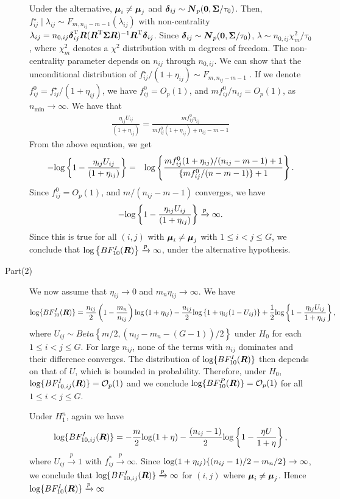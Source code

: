 \documentclass[12pt]{article}
\def\log{\hbox{log}}
\def\log{\hbox{log}}
\def\bse{\begin{eqnarray*}}
\def\ese{\end{eqnarray*}}
\def\be{\begin{eqnarray}}
\def\ee{\end{eqnarray}}
\def\trans{^{\rm T}}
\newcommand{\uN}       {\mbox{\boldmath$N$}}
\newcommand{\uR}       {\mbox{\boldmath$R$}}
\newcommand{\udelta}            {\mbox{\boldmath$\delta$}}
\newcommand{\umu}               {\mbox{\boldmath$\mu$}}
\newcommand{\uSigma}            {\mbox{\boldmath$\Sigma$}}
\begin{document}
\begin{description}
Under the alternative, $\umu_{i} \neq \umu_{j}$ and $\udelta_{ij} \sim \uN_{p}({\bf 0}, \uSigma /\tau_{0})$.
Then, $f_{ij}^{\star} \mid   \lambda_{ij} \sim F_{m, n_{ij}-m-1}(\lambda_{ij})$
with non-centrality $\lambda_{ij} = n_{0,ij}\udelta_{ij}\trans\uR(\uR\trans \uSigma \uR)^{-1}\uR\trans \udelta_{ij}$.
Since $\udelta_{ij} \sim \uN_{p}({\bf 0}, \uSigma /\tau_{0})$, $\lambda \sim n_{0,ij}\chi_{m}^{2}/\tau_{0}$,
where $\chi_{m}^{2}$ denotes a $\chi^{2}$ distribution with m degrees of freedom. The non-centrality parameter depends on $n_{ij}$ through $n_{0,ij}$.
We can show that the unconditional distribution of $f_{ij}^{\star} /(1 + \eta_{ij}) \sim F_{m, n_{ij}-m-1}$ \citep[see][page 704]{johnson2005bayes}.
If we denote $f_{ij}^{0} =  f_{ij}^{\star} /(1 + \eta_{ij})$, we have $f_{ij}^{0} = O_{p}(1)$, and $mf_{ij}^{0}/n_{ij} = O_{p}(1)$, as $n_{\min} \rightarrow \infty$.
We have that
\be
\frac{\eta_{ij} U_{ij}}{(1+\eta_{ij})} = \frac{ m f_{ij}^{0}\eta_{ij}}{m f_{ij}^{0}(1+\eta_{ij})+n_{ij}-m-1} \nonumber
\ee
From the above equation, we get
\be
-\log\left\{ 1 - \frac{\eta_{ij} U_{ij}}{(1+\eta_{ij})} \right \} &=& \log\left\{ \frac{mf_{ij}^{0}(1+\eta_{ij})/(n_{ij}-m-1) + 1}{\{mf_{ij}^{0}/(n-m-1)\} +1 }\right\}. \nonumber
\ee
Since $f_{ij}^{0} = O_{p}(1)$, and $m/(n_{ij}-m-1)$ converges, we have
\bse
 -\log\left\{ 1 - \frac{\eta_{ij} U_{ij}}{(1+\eta_{ij})} \right \} \xrightarrow[]{p} \infty.
\ese
Since this is true for all $(i,j)$ with $\umu_i \neq \umu_j$ with $1 \leq i < j \leq G$,  we conclude that $\log\left\{BF^{I}_{10}(\uR) \right \} \xrightarrow[]{p} \infty$, under the alternative hypothesis.

\item[Part(2)]
We now assume that $\eta_{ij} \rightarrow 0$ and $m_n \eta_{ij} \rightarrow \infty$. We have
\be
 \log\{BF^{I}_{10}(\uR)\} =\frac{n_{ij}}{2}\left( 1 - \frac{m_n}{n_{ij}}\right)\log\left(1 + \eta_{ij} \right) - \frac{n_{ij}}{2}\log\left\{ 1 + \eta_{ij}(1-U_{ij}) \right \} +\frac{1}{2}\log \left\{1 - \frac{\eta_{ij} U_{ij}}{1+\eta_{ij}}\right\},  \nonumber
\ee
where $U_{ij} \sim Beta\left\{ m/2,  (n_{ij} - m_n -(G-1))/2 \right\}$ under $H_0$ for each $1 \leq i < j \leq G$.
For large $n_{ij}$, none of the terms with $n_{ij}$ dominates and their difference converges.
The distribution of $\log\{BF^{I}_{10}(\uR) \}$ then depends on that of $U$, which is bounded in probability.
Therefore, under $H_0$, $\log\{BF^{I}_{10, ij}(\uR) \} = \mathcal{O}_{p}(1)$ and we conclude $\log\{BF^{P}_{10}(\uR) \} = \mathcal{O}_{p}(1)$ for all $1 \leq i < j \leq G$.

Under $H^{n}_{1}$, again we have
\be
\log\{BF^{I}_{10,ij}(\uR) \} = -\frac{m}{2}\log(1 + \eta) - \frac{(n_{ij}-1)}{2}\log\left\{ 1 - \frac{\eta U}{1 + \eta} \right\}, \nonumber
\ee
where $U_{ij} \xrightarrow[]{p} 1$ with $f_{ij}^{*}\xrightarrow[]{p} \infty$.
Since $\log(1 + \eta_{ij})\{ (n_{ij}-1)/2 - m_n/2\} \rightarrow \infty$, we conclude that $\log\{BF^{I}_{10,ij}(\uR) \} \xrightarrow[]{p} \infty $ for $(i,j)$ where $\umu_i \neq \umu_j$. Hence $\log\{BF^{I}_{10}(\uR) \} \xrightarrow[]{p} \infty $
\end{description}
\end{document}
